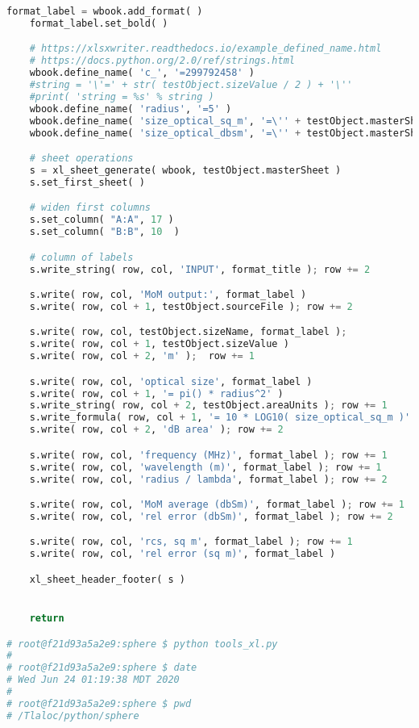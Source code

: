 {{\begin{lstlisting}[language=Python]
    format_label = wbook.add_format( )
    format_label.set_bold( )

    # https://xlsxwriter.readthedocs.io/example_defined_name.html
    # https://docs.python.org/2.0/ref/strings.html
    wbook.define_name( 'c_', '=299792458' )
    #string = '\'=' + str( testObject.sizeValue / 2 ) + '\''
    #print( 'string = %s' % string )
    wbook.define_name( 'radius', '=5' )
    wbook.define_name( 'size_optical_sq_m', '=\'' + testObject.masterSheet + '\'!$B$6' )
    wbook.define_name( 'size_optical_dbsm', '=\'' + testObject.masterSheet + '\'!$B$7' )

    # sheet operations
    s = xl_sheet_generate( wbook, testObject.masterSheet )
    s.set_first_sheet( )

    # widen first columns
    s.set_column( "A:A", 17 )
    s.set_column( "B:B", 10  )

    # column of labels
    s.write_string( row, col, 'INPUT', format_title ); row += 2

    s.write( row, col, 'MoM output:', format_label )
    s.write( row, col + 1, testObject.sourceFile ); row += 2

    s.write( row, col, testObject.sizeName, format_label );
    s.write( row, col + 1, testObject.sizeValue )
    s.write( row, col + 2, 'm' );  row += 1

    s.write( row, col, 'optical size', format_label )
    s.write( row, col + 1, '= pi() * radius^2' )
    s.write_string( row, col + 2, testObject.areaUnits ); row += 1
    s.write_formula( row, col + 1, '= 10 * LOG10( size_optical_sq_m )' );
    s.write( row, col + 2, 'dB area' ); row += 2

    s.write( row, col, 'frequency (MHz)', format_label ); row += 1
    s.write( row, col, 'wavelength (m)', format_label ); row += 1
    s.write( row, col, 'radius / lambda', format_label ); row += 2

    s.write( row, col, 'MoM average (dbSm)', format_label ); row += 1
    s.write( row, col, 'rel error (dbSm)', format_label ); row += 2

    s.write( row, col, 'rcs, sq m', format_label ); row += 1
    s.write( row, col, 'rel error (sq m)', format_label )

    xl_sheet_header_footer( s )


    return

# root@f21d93a5a2e9:sphere $ python tools_xl.py
#
# root@f21d93a5a2e9:sphere $ date
# Wed Jun 24 01:19:38 MDT 2020
#
# root@f21d93a5a2e9:sphere $ pwd
# /Tlaloc/python/sphere
	\end{lstlisting}
	}}

\endinput  %

